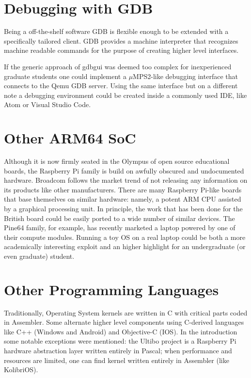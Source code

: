 \documentclass[12pt,a4paper,openright,twoside]{report}
\begin{document}
\section{Debugging with GDB}
Being a off-the-shelf software GDB is flexible enough to be extended with 
a specifically tailored client. GDB provides a machine interpreter that recognizes
machine readable commands for the purpose of creating higher level interfaces.

If the generic approach of gdbgui was deemed too complex for inexperienced graduate
students one could implement a $\mu$MPS2-like debugging interface that connects
to the Qemu GDB server. Using the same interface but on a different note a
debugging environment could be created inside a commonly used IDE, like Atom or 
Visual Studio Code.

\section{Other ARM64 SoC}
Although it is now firmly seated in the Olympus of open source educational boards,
the Raspberry Pi family is build on awfully obscured and undocumented hardware.
Broadcom follows the market trend of not releasing any information on its 
products like other manufacturers.
There are many Raspberry Pi-like boards that base themselves on similar hardware:
namely, a potent ARM CPU assisted by a graphical processing unit. In principle,
the work that has been done for the British board could be easily ported to a 
wide number of similar devices. The Pine64 family, for example, has recently
marketed a laptop powered by one of their compute modules. Running a toy
OS on a real laptop could be both a more academically interesting exploit and
 an higher highlight for an undergraduate (or even graduate) student.

\section{Other Programming Languages}
Traditionally, Operating System kernels are written in C with critical parts
coded in Assembler. Some alternate higher level components using C-derived 
languages like C++ (Windows and Android) and Objective-C (IOS).
In the introduction some notable exceptions were mentioned: the Ultibo project 
\cite{ultibo} is a Raspberry Pi hardware abstraction layer written entirely in 
Pascal; when performance and resources are limited, one can find kernel written
entirely in Assembler (like KolibriOS).
\end{document}
